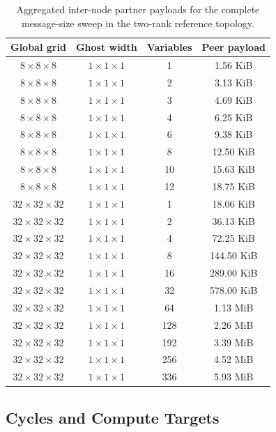 \begin{table}[p]
	\centering
	\caption{Aggregated inter-node partner payloads for the complete message-size
		sweep in the two-rank reference topology.}
	\label{tab:payload-2n2r}
	\begin{tabular}{cccc}
		\toprule
		Global grid & Ghost width & Variables & Peer payload \\
		\midrule
		$8\times8\times8$ & $1\times1\times1$ & 1  & 1.56 KiB  \\
		$8\times8\times8$ & $1\times1\times1$ & 2  & 3.13 KiB  \\
		$8\times8\times8$ & $1\times1\times1$ & 3  & 4.69 KiB  \\
		$8\times8\times8$ & $1\times1\times1$ & 4  & 6.25 KiB  \\
		$8\times8\times8$ & $1\times1\times1$ & 6  & 9.38 KiB  \\
		$8\times8\times8$ & $1\times1\times1$ & 8  & 12.50 KiB \\
		$8\times8\times8$ & $1\times1\times1$ & 10 & 15.63 KiB \\
		$8\times8\times8$ & $1\times1\times1$ & 12 & 18.75 KiB \\
		\midrule
		$32\times32\times32$ & $1\times1\times1$ & 1   & 18.06 KiB  \\
		$32\times32\times32$ & $1\times1\times1$ & 2   & 36.13 KiB  \\
		$32\times32\times32$ & $1\times1\times1$ & 4   & 72.25 KiB  \\
		$32\times32\times32$ & $1\times1\times1$ & 8   & 144.50 KiB \\
		$32\times32\times32$ & $1\times1\times1$ & 16  & 289.00 KiB \\
		$32\times32\times32$ & $1\times1\times1$ & 32  & 578.00 KiB \\
		$32\times32\times32$ & $1\times1\times1$ & 64  & 1.13 MiB   \\
		$32\times32\times32$ & $1\times1\times1$ & 128 & 2.26 MiB   \\
		$32\times32\times32$ & $1\times1\times1$ & 192 & 3.39 MiB   \\
		$32\times32\times32$ & $1\times1\times1$ & 256 & 4.52 MiB   \\
		$32\times32\times32$ & $1\times1\times1$ & 336 & 5.93 MiB   \\
		\bottomrule
	\end{tabular}
\end{table}

\subsection{Cycles and Compute Targets}
\label{sec:cycles-compute-targets}

